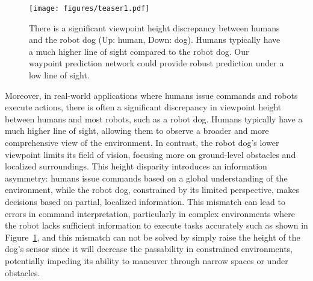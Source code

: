 \begin{figure}[t]
      \centering
      \texttt{[image: figures/teaser1.pdf]}
      \vspace{-25pt}
      \caption{There is a significant viewpoint height discrepancy between humans and the robot dog (Up: human, Down: dog). Humans typically have a much higher line of sight compared to the robot dog. Our waypoint prediction network could provide robust prediction under a low line of sight.}
      \label{view}
\vspace{-20pt}
\end{figure}

Moreover, in real-world applications where humans issue commands and robots execute actions, there is often a significant discrepancy in viewpoint height between humans and most robots, such as a robot dog. Humans typically have a much higher line of sight, allowing them to observe a broader and more comprehensive view of the environment. In contrast, the robot dog’s lower viewpoint limits its field of vision, focusing more on ground-level obstacles and localized surroundings. This height disparity introduces an information asymmetry: humans issue commands based on a global understanding of the environment, while the robot dog, constrained by its limited perspective, makes decisions based on partial, localized information. This mismatch can lead to errors in command interpretation, particularly in complex environments where the robot lacks sufficient information to execute tasks accurately such as shown in Figure~\ref{view}, and this mismatch can not be solved by simply raise the height of the dog's sensor since it will decrease the passability in constrained environments, potentially impeding its ability to maneuver through narrow spaces or under obstacles.

